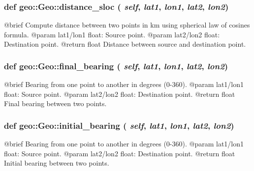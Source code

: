  \hypertarget{classgeo_1_1Geo_a6c1debeb7971d51ddd7d0d9bdbd4427c}{
\subsubsection[{distance\_\-sloc}]{\setlength{\rightskip}{0pt plus 5cm}def geo::Geo::distance\_\-sloc ( {\em self}, \/   {\em lat1}, \/   {\em lon1}, \/   {\em lat2}, \/   {\em lon2})}}
\label{classgeo_1_1Geo_a6c1debeb7971d51ddd7d0d9bdbd4427c}
\begin{DoxyVerb}@brief Compute distance between two points in km using
    spherical law of cosines formula.
    @param {lat1/lon1} float: Source point.
    @param {lat2/lon2} float: Destination point.
    @return float Distance between source and destination point. \end{DoxyVerb}
 \hypertarget{classgeo_1_1Geo_a14e0f58bfe4e3a6f06fcf3491213dbaf}{
\subsubsection[{final\_\-bearing}]{\setlength{\rightskip}{0pt plus 5cm}def geo::Geo::final\_\-bearing ( {\em self}, \/   {\em lat1}, \/   {\em lon1}, \/   {\em lat2}, \/   {\em lon2})}}
\label{classgeo_1_1Geo_a14e0f58bfe4e3a6f06fcf3491213dbaf}
\begin{DoxyVerb}@brief Bearing from one point to another in degrees (0-360).
    @param {lat1/lon1} float: Source point.
    @param {lat2/lon2} float: Destination point.
    @return float Final bearing between two points.\end{DoxyVerb}
 \hypertarget{classgeo_1_1Geo_ae565566c5d90208ea5f67656f52d0092}{
\subsubsection[{initial\_\-bearing}]{\setlength{\rightskip}{0pt plus 5cm}def geo::Geo::initial\_\-bearing ( {\em self}, \/   {\em lat1}, \/   {\em lon1}, \/   {\em lat2}, \/   {\em lon2})}}
\label{classgeo_1_1Geo_ae565566c5d90208ea5f67656f52d0092}
\begin{DoxyVerb}@brief Bearing from one point to another in degrees (0-360).
    @param {lat1/lon1} float: Source point.
    @param {lat2/lon2} float: Destination point.
    @return float Initial bearing between two points.\end{DoxyVerb}
